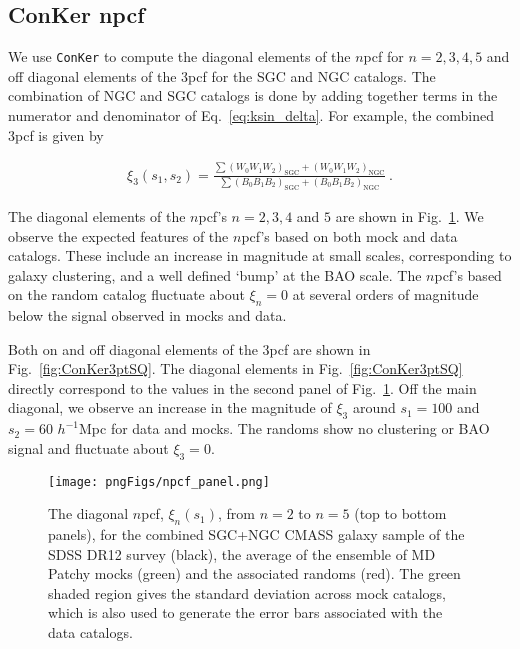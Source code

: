 \documentclass{aa}
\begin{document}
\subsection{ConKer npcf}
\label{subsec:conkernpcf}

We use {\tt ConKer} to compute the diagonal elements of the $n$pcf for $n=2,3,4,5$ and off diagonal elements of the 3pcf for the SGC and NGC catalogs. The combination of NGC and SGC catalogs is done by adding together terms in the numerator and denominator of Eq.~\ref{eq:ksin_delta}. For example, the combined 3pcf is given by

\begin{align}
\xi_3(s_1,s_2) =\frac{\sum (W_0 W_1 W_2)_{\mathrm{SGC}} + (W_0 W_1 W_2)_{\mathrm{NGC}}} {\sum (B_0 B_1 B_2)_{\mathrm{SGC}} + (B_0 B_1 B_2)_{\mathrm{NGC}}}\ . 
\label{eq:ksi3combined}
\end{align}

The diagonal elements of the $n$pcf's $n=2, 3, 4$ and $5$ are shown in Fig.~\ref{fig:npcfPanel}. We observe the expected features of the $n$pcf's based on both mock and data catalogs. These include an increase in magnitude at small scales, corresponding to galaxy clustering, and a well defined `bump' at the BAO scale. The $n$pcf's based on the random catalog fluctuate about $\xi_n = 0$ at several orders of magnitude below the signal observed in mocks and data.

Both on and off diagonal elements of the 3pcf are shown in Fig.~\ref{fig:ConKer3ptSQ}. The diagonal elements in Fig.~\ref{fig:ConKer3ptSQ} directly correspond to the values in the second panel of Fig.~\ref{fig:npcfPanel}. Off the main diagonal, we observe an increase in the magnitude of $\xi_3$ around $s_1 = 100$ and $s_2 = 60$ $h^{-1}$Mpc for data and mocks. The randoms show no clustering or BAO signal and fluctuate about $\xi_3 = 0$. 

\begin{figure}
\texttt{[image: pngFigs/npcf\_panel.png]}
\caption{The diagonal $n$pcf, $\xi_n(s_1)$, from $n=2$ to $n=5$ (top to bottom panels), for the combined SGC+NGC CMASS galaxy sample of the SDSS DR12 survey (black), the average of the ensemble of MD Patchy mocks (green) and the associated randoms (red). The green shaded region gives the standard deviation across mock catalogs, which is also used to generate the error bars associated with the data catalogs.}
\label{fig:npcfPanel}
\end{figure}
\end{document}
